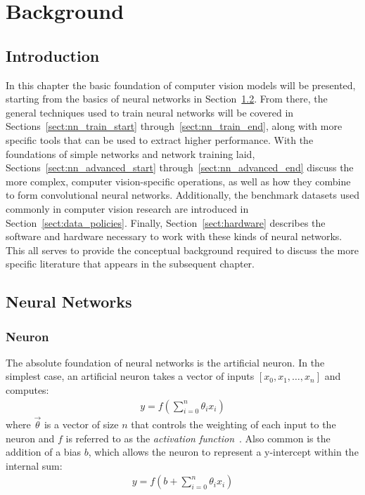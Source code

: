 

\graphicspath{{Chapters/background/figures/}}

\chapter{Background} \label{chapter:background}
\section{Introduction}
In this chapter the basic foundation of computer vision models will be presented, starting
from the basics of neural networks in Section~\ref{sect:nn_basics}. From there,
the general techniques used to train neural networks will be covered in
Sections~\ref{sect:nn_train_start} through~\ref{sect:nn_train_end}, along with more
specific tools that can be used to extract higher performance. With the foundations of simple networks and
network training laid, Sections~\ref{sect:nn_advanced_start} through~\ref{sect:nn_advanced_end} discuss the more complex,
computer vision-specific operations, as well as how they combine to form convolutional neural networks.
Additionally, the benchmark datasets used commonly in computer vision research are introduced in
Section~\ref{sect:data_policies}. Finally, Section~\ref{sect:hardware} describes
the software and hardware necessary to work with these kinds of neural networks.
This all serves to provide the conceptual background required to discuss the
more specific literature that appears in the subsequent chapter.

\section{Neural Networks} \label{sect:nn_basics}
\subsection{Neuron}
The absolute foundation of neural networks is the artificial neuron. In the simplest case, an artificial neuron takes
a vector of inputs $[x_0, x_1, \dots, x_n]$ and computes:
\begin{align}
	y = f \left(\sum_{i=0}^{n} \theta_{i} x_i \right) \label{eq:ffw_layer}
\end{align}
\noindent where $\vec{\theta}$ is a vector of size $n$ that controls the weighting of each input to the neuron and $f$ is referred
to as the \textit{activation function}~\citep{anthony2001}. Also common is the addition of a bias $b$, which allows the neuron to
represent a y-intercept within the internal sum:
\begin{align}
	y = f \left(b + \sum_{i=0}^{n} \theta_{i} x_i \right)
\end{align}

